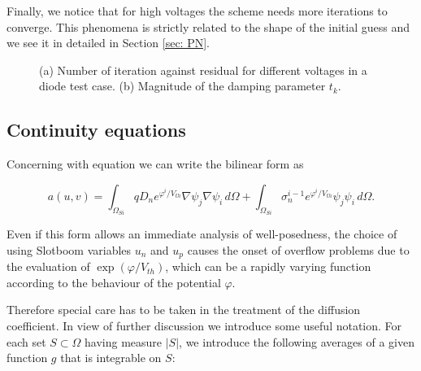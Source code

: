Finally, we notice that for high voltages the scheme needs more iterations to converge. This phenomena is strictly related to the shape of the initial guess and we see it in detailed in Section \ref{sec: PN}. 

\begin{figure}[!h]
\centering


\vspace{1cm}


\caption{(a) Number of iteration against residual for different voltages in a diode test case. (b) Magnitude of the damping parameter $t_k$.}

\end{figure}

\clearpage


\subsection{Continuity equations}
\label{sec: continuity equations}

Concerning with equation  we can write the bilinear form as

\begin{equation}
\label{eq: weak formulation displacement}
a(u,v) =  \int_{\Omega_{Si}}  q D_n e^{\varphi^{i}/V_{th}} \nabla \psi_j \nabla \psi_i \, d\Omega + \int_{\Omega_{Si}} \sigma_n^{i-1} e^{\varphi^{i}/V_{th}} \psi_j \psi_i \, d\Omega.
\end{equation}

Even if this form allows an immediate analysis of well-posedness, the choice of using Slotboom variables $u_n$ and $u_p$ causes the onset of overflow problems due to the evaluation of $\exp(\varphi/V_{th})$, which can be a rapidly varying function according to the behaviour of the potential $\varphi$.

Therefore special care has to be taken in the treatment of the diffusion coefficient. In view of further discussion we introduce some useful notation. For each set $S \subset \Omega$ having measure $|S|$, we introduce the following averages of a given function $g$ that is integrable on $S$:

